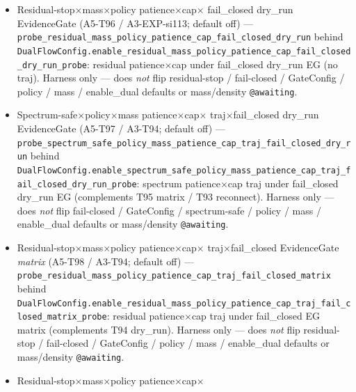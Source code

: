 \documentclass[11pt]{article}
\begin{document}
\begin{itemize}[leftmargin=1.5em]
  traj$\times$fail\_closed EvidenceGate \emph{matrix} (A5-T95 /
  A3-EXP-si113; default off) ---
  \texttt{probe\_spectrum\_safe\_policy\_mass\_patience\_cap\_traj\_fail\_closed\_matrix}
  behind
  \texttt{DualFlowConfig.enable\_spectrum\_safe\_policy\_mass\_patience\_cap\_traj\_fail\_closed\_matrix\_probe}:
  expands spectrum patience$\times$cap traj into a full
  patience$\times$cap$\times$EG matrix. Harness only --- does \emph{not}
  flip fail-closed / GateConfig / spectrum-safe / policy / mass /
  enable\_dual defaults or mass/density \texttt{@awaiting}.
  \item Residual-stop$\times$mass$\times$policy patience$\times$cap$\times$
  fail\_closed dry\_run EvidenceGate (A5-T96 / A3-EXP-si113; default off)
  ---
  \texttt{probe\_residual\_mass\_policy\_patience\_cap\_fail\_closed\_dry\_run}
  behind
  \texttt{DualFlowConfig.enable\_residual\_mass\_policy\_patience\_cap\_fail\_closed\_dry\_run\_probe}:
  residual patience$\times$cap under fail\_closed dry\_run EG (no traj).
  Harness only --- does \emph{not} flip residual-stop / fail-closed /
  GateConfig / policy / mass / enable\_dual defaults or mass/density
  \texttt{@awaiting}.
  \item Spectrum-safe$\times$policy$\times$mass patience$\times$cap$\times$
  traj$\times$fail\_closed dry\_run EvidenceGate (A5-T97 / A3-T94;
  default off) ---
  \texttt{probe\_spectrum\_safe\_policy\_mass\_patience\_cap\_traj\_fail\_closed\_dry\_run}
  behind
  \texttt{DualFlowConfig.enable\_spectrum\_safe\_policy\_mass\_patience\_cap\_traj\_fail\_closed\_dry\_run\_probe}:
  spectrum patience$\times$cap traj under fail\_closed dry\_run EG
  (complements T95 matrix / T93 reconnect). Harness only --- does
  \emph{not} flip fail-closed / GateConfig / spectrum-safe / policy /
  mass / enable\_dual defaults or mass/density \texttt{@awaiting}.
  \item Residual-stop$\times$mass$\times$policy patience$\times$cap$\times$
  traj$\times$fail\_closed EvidenceGate \emph{matrix} (A5-T98 / A3-T94;
  default off) ---
  \texttt{probe\_residual\_mass\_policy\_patience\_cap\_traj\_fail\_closed\_matrix}
  behind
  \texttt{DualFlowConfig.enable\_residual\_mass\_policy\_patience\_cap\_traj\_fail\_closed\_matrix\_probe}:
  residual patience$\times$cap traj under fail\_closed EG matrix
  (complements T94 dry\_run). Harness only --- does \emph{not} flip
  residual-stop / fail-closed / GateConfig / policy / mass /
  enable\_dual defaults or mass/density \texttt{@awaiting}.
  \item Residual-stop$\times$mass$\times$policy patience$\times$cap$\times$

\end{itemize}
\end{document}
